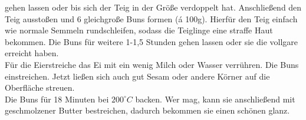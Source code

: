 gehen lassen oder bis sich der Teig in der Größe verdoppelt hat.
Anschließend den Teig ausstoßen und 6 gleichgroße Buns formen
(á 100g). Hierfür den Teig einfach wie normale Semmeln
rundschleifen, sodass die Teiglinge eine straffe Haut bekommen.
Die Buns für weitere 1-1,5 Stunden gehen lassen oder sie die
vollgare erreicht haben.\\
Für die Eierstreiche das Ei mit ein wenig Milch oder Wasser verrühren.
Die Buns einstreichen. Jetzt ließen sich auch gut Sesam
oder andere Körner auf die Oberfläche streuen.\\
Die Buns für 18 Minuten bei $200^\circ C$ backen. Wer mag, kann sie
anschließend mit geschmolzener Butter bestreichen, dadurch
bekommen sie einen schönen glanz.\\
\newpage